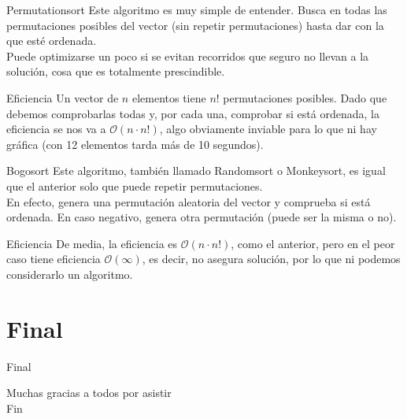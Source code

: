 \documentclass[compress]{beamer}
\begin{document}
\begin{frame}{Permutationsort}
Este algoritmo es muy simple de entender. Busca en todas las permutaciones posibles del vector (sin repetir permutaciones) hasta dar con la que esté ordenada.\\
\vspace{0.20in}
Puede optimizarse un poco si se evitan recorridos que seguro no llevan a la solución, cosa que es totalmente prescindible.\\
	\begin{block}{Eficiencia}
	Un vector de $n$ elementos tiene $n!$ permutaciones posibles. Dado que debemos comprobarlas todas y, por cada una, comprobar si está ordenada, la eficiencia se nos va a $\mathcal{O}(n\cdot n!)$, algo obviamente inviable para lo que ni hay gráfica (con 12 elementos tarda más de 10 segundos).
	\end{block}
\end{frame}

\begin{frame}{Bogosort}
Este algoritmo, también llamado Randomsort o Monkeysort, es igual que el anterior solo que puede repetir permutaciones.\\
\vspace{0.20in}
En efecto, genera una permutación aleatoria del vector y comprueba si está ordenada. En caso negativo, genera otra permutación (puede ser la misma o no).\\
	\begin{block}{Eficiencia}
	De media, la eficiencia es $\mathcal{O}(n\cdot n!)$, como el anterior, pero en el peor caso tiene eficiencia $\mathcal{O}(\infty)$, es decir, no asegura solución, por lo que ni podemos considerarlo un algoritmo.
	\end{block}
\end{frame}

\section{Final}

\begin{frame}{Final}
	\begin{center}
	{\Large Muchas gracias a todos por asistir}\\
	\vspace{0.30in}
	{\Huge Fin}
	\end{center}
\end{frame}
\end{document}
